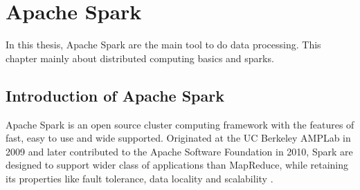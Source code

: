 \chapter{Apache Spark}

In this thesis, Apache Spark are the main tool to do data processing. This chapter mainly about distributed computing basics and sparks.


\section{Introduction of Apache Spark}

Apache Spark is an open source cluster computing framework with the features of fast, easy to use and wide supported. Originated at the UC Berkeley AMPLab in 2009 and later contributed to the Apache Software Foundation in 2010, Spark are designed to support wider class of applications than MapReduce, while retaining its properties like fault tolerance, data locality and scalability \cite{1_ryza_laserson_owen_wills}.
